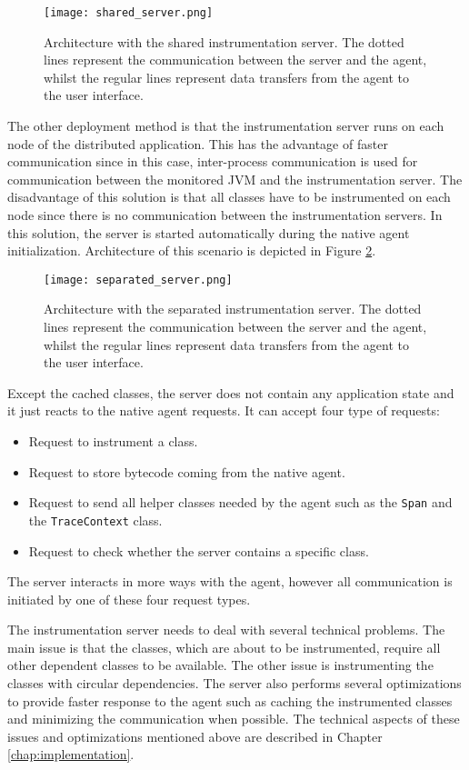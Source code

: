  \begin{figure}
 	\centering
 	\texttt{[image: shared\_server.png]}
 	\caption{Architecture with the shared instrumentation server. The dotted lines represent the communication between the server and the agent, whilst the regular lines represent data transfers from the agent to the user interface.}
 	\label{fig:shared_server}
 \end{figure}
 
 The other deployment method is that the instrumentation server runs on each node of the distributed application. This has the advantage of faster communication since in this case, inter-process communication is used for communication between the monitored JVM and the instrumentation server. The disadvantage of this solution is that all classes have to be instrumented on each node since there is no communication between the instrumentation servers. In this solution, the server is started automatically during the native agent initialization. Architecture of this scenario is depicted in Figure \ref{fig:separated_server}.
 
 \begin{figure}
 	\centering
 	\texttt{[image: separated\_server.png]}
 	\caption{Architecture with the separated instrumentation server. The dotted lines represent the communication between the server and the agent, whilst the regular lines represent data transfers from the agent to the user interface.}
 	\label{fig:separated_server}
 \end{figure}

Except the cached classes, the server does not contain any application state and it just reacts to the native agent requests. It can accept four type of requests:
\begin{itemize}
	\item Request to instrument a class.
	\item Request to store bytecode coming from the native agent.
	\item Request to send all helper classes needed by the agent such as the \texttt{Span} and the \texttt{TraceContext} class.
	\item Request to check whether the server contains a specific class.
\end{itemize}
The server interacts in more ways with the agent, however all communication is initiated by one of these four request types. 

The instrumentation server needs to deal with several technical problems. The main issue is that the classes, which are about to be instrumented, require all other dependent classes to be available. The other issue is instrumenting the classes with circular dependencies. The server also performs several optimizations to provide faster response to the agent such as caching the instrumented classes and minimizing the communication when possible. The technical aspects of these issues and optimizations mentioned above are described in Chapter \ref{chap:implementation}.

